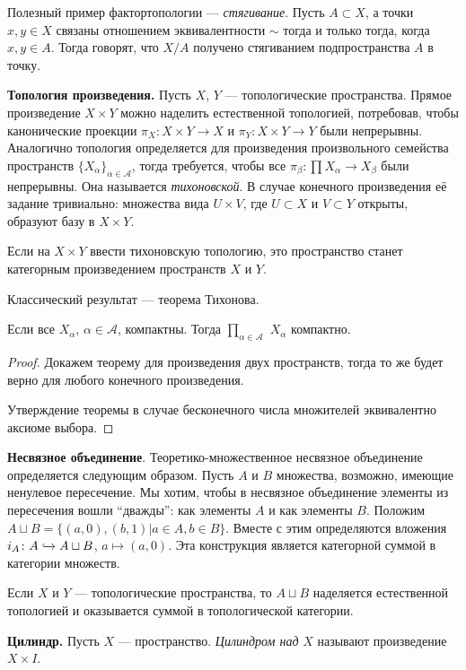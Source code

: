 Полезный пример фактортопологии --- \textit{стягивание}. Пусть $A\subset X$, а точки $x,y\in X$ связаны отношением эквивалентности $\sim$ тогда и только тогда, когда $x,y\in A$. Тогда говорят, что $X/A$ получено стягиванием подпространства $A$ в точку.

\textbf{Топология произведения.} Пусть $X$, $Y$ --- топологические пространства. Прямое произведение $X\times Y$ можно наделить естественной топологией, потребовав, чтобы канонические проекции $\pi_X\colon X\times Y\to X$ и $\pi_Y\colon X\times Y\to Y$ были непрерывны. Аналогично топология определяется для произведения произвольного семейства пространств $\{X_{\alpha}\}_{\alpha\in\mathcal{A}}$, тогда требуется, чтобы все $\pi_{\beta}\colon\prod X_{\alpha}\to X_{\beta}$ были непрерывны. Она называется \textit{тихоновской}. В случае конечного произведения её задание тривиально: множества вида $U\times V$, где $U\subset X$ и $V\subset Y$ открыты, образуют базу в $X\times Y$.

Если на $X\times Y$ ввести тихоновскую топологию, это пространство станет категорным произведением пространств $X$ и $Y$.

Классический результат --- теорема Тихонова.
\begin{theorem}
	Если все $X_{\alpha}$, $\alpha\in\mathcal{A}$, компактны. Тогда $\prod\limits_{\alpha\in\mathcal{A}}$ $X_{\alpha}$ компактно.
\end{theorem}
\begin{proof}
Докажем теорему для произведения двух пространств, тогда то же будет верно для любого конечного произведения.

Утверждение теоремы в случае бесконечного числа множителей эквивалентно аксиоме выбора.
\end{proof}

\textbf{Несвязное объединение}. Теоретико-множественное несвязное объединение определяется следующим образом. Пусть $A$ и $B$ множества, возможно, имеющие ненулевое пересечение. Мы хотим, чтобы в несвязное объединение элементы из пересечения вошли ``дважды'': как элементы $A$ и как элементы $B$. Положим $A\sqcup B=\{(a,0), (b,1)|a\in A, b\in B\}$. Вместе с этим определяются вложения $i_A\colon A\xhookrightarrow{} A\sqcup B$, $a\mapsto (a,0)$. Эта конструкция является категорной суммой в категории множеств.

Если $X$ и $Y$ --- топологические пространства, то $A\sqcup B$ наделяется естественной топологией и оказывается суммой в топологической категории.

\textbf{Цилиндр.} Пусть $X$ --- пространство. \textit{Цилиндром над} $X$ называют произведение $X\times I$.

